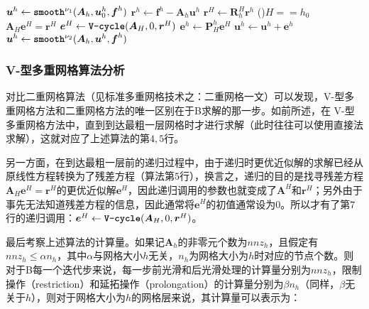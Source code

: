 \documentclass[12pt, UTF8, nofonts]{ctexart}
\begin{document}
\begin{algorithm}[H]
  $\boldsymbol{u}^h \gets \textbf{\texttt{smooth}}^{\nu_1}(\boldsymbol{A}_h,\boldsymbol{u}_{0}^h,\boldsymbol{f}^h)$
  $\boldsymbol{r}^h \gets \boldsymbol{f}^h - \boldsymbol{A}_h \boldsymbol{u}^h$
  $\boldsymbol{r}^{H} \gets \boldsymbol{R}_{h}^{H}\boldsymbol{r}^h$
  \eIf(){$H==h_0$}{
    $\boldsymbol{A}_{H} \boldsymbol{e}^{H} = \boldsymbol{r}^{H}$
  }{
    $\boldsymbol{e}^H \gets \textbf{\texttt{V-cycle}}(\boldsymbol{A}_H,0,\boldsymbol{r}^H)$
  }
  $\boldsymbol{e}^h \gets \boldsymbol{P}_{H}^{h} \boldsymbol{e}^{H}$
  $\boldsymbol{u}^h \gets \boldsymbol{u}^h + \boldsymbol{e}^h$
  $\boldsymbol{u}^h \gets \textbf{\texttt{smooth}}^{\nu_2}(\boldsymbol{A}_h, \boldsymbol{u}^h, \boldsymbol{f}^h)$
\end{algorithm}



\subsubsection*{V-型多重网格算法分析}

对比二重网格算法（见标准多重网格技术之：二重网格一文）可以发现，V-型多重网格方法和二重网格方法的唯一区别在于B求解的那一步。如前所述，在 V-型多重网格方法中，直到到达最粗一层网格时才进行求解（此时往往可以使用直接法求解），这就对应了上述算法的第$4,5$行。

另一方面，在到达最粗一层前的递归过程中，由于递归时更优近似解的求解已经从原线性方程转换为了残差方程（算法第$5$行），换言之，递归的目的是找寻残差方程$\boldsymbol{A}_H\boldsymbol{e}^H=\boldsymbol{r}^H$的更优近似解$\boldsymbol{e}^H$，因此递归调用的参数也就变成了$\boldsymbol{A}^H$和$\boldsymbol{r}^H$；另外由于事先无法知道残差方程的信息，因此通常将$\boldsymbol{e}^H$的初值通常设为$0$。所以才有了第$7$行的递归调用：$\boldsymbol{e}^H \gets \textbf{\texttt{V-cycle}}(\boldsymbol{A}_H,0,\boldsymbol{r}^H)$。

最后考察上述算法的计算量。如果记$\boldsymbol{A}_h$的非零元个数为$nnz_h$，且假定有$nnz_h\leq\alpha n_h$，其中$\alpha$与网格大小$h$无关，$n_h$为网格大小为$h$时对应的节点个数。则对于B每一个迭代步来说，每一步前光滑和后光滑处理的计算量分别为$nnz_h$，限制操作（restriction）和延拓操作（prolongation）的计算量分别为$\beta n_h$（同样，$\beta$无关于$h$），则对于网格大小为$h$的网格层来说，其计算量可以表示为：
\end{document}

